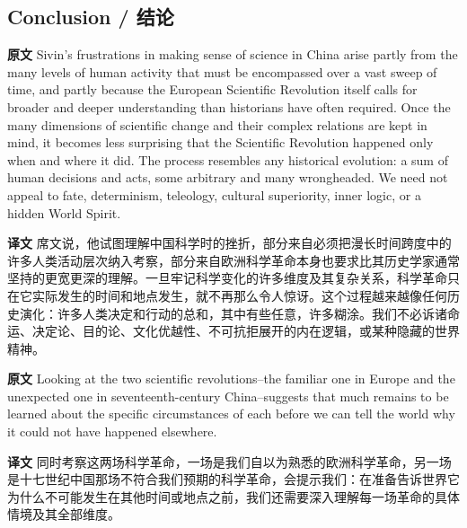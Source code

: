 \documentclass[UTF8,zihao=-4]{ctexart}
\newcommand{\BodyFont}{\fontsize{10.5pt}{15.5pt}\selectfont}
\newcommand{\origlabel}{\textbf{原文}\quad}
\newcommand{\translabel}{\textbf{译文}\quad}
\newenvironment{enblock}{\par\noindent\begingroup\BodyFont\origlabel}{\par\endgroup}
\newenvironment{zhblock}{\par\noindent\begingroup\BodyFont\translabel}{\par\endgroup\vspace{0.35em}}
\begin{document}
\subsection*{Conclusion / 结论}

\begin{enblock}
Sivin's frustrations in making sense of science in China arise partly from the many levels of human activity that must be encompassed over a vast sweep of time, and partly because the European Scientific Revolution itself calls for broader and deeper understanding than historians have often required. Once the many dimensions of scientific change and their complex relations are kept in mind, it becomes less surprising that the Scientific Revolution happened only when and where it did. The process resembles any historical evolution: a sum of human decisions and acts, some arbitrary and many wrongheaded. We need not appeal to fate, determinism, teleology, cultural superiority, inner logic, or a hidden World Spirit.
\end{enblock}
\begin{zhblock}
席文说，他试图理解中国科学时的挫折，部分来自必须把漫长时间跨度中的许多人类活动层次纳入考察，部分来自欧洲科学革命本身也要求比其历史学家通常坚持的更宽更深的理解。一旦牢记科学变化的许多维度及其复杂关系，科学革命只在它实际发生的时间和地点发生，就不再那么令人惊讶。这个过程越来越像任何历史演化：许多人类决定和行动的总和，其中有些任意，许多糊涂。我们不必诉诸命运、决定论、目的论、文化优越性、不可抗拒展开的内在逻辑，或某种隐藏的世界精神。
\end{zhblock}

\begin{enblock}
Looking at the two scientific revolutions--the familiar one in Europe and the unexpected one in seventeenth-century China--suggests that much remains to be learned about the specific circumstances of each before we can tell the world why it could not have happened elsewhere.
\end{enblock}
\begin{zhblock}
同时考察这两场科学革命，一场是我们自以为熟悉的欧洲科学革命，另一场是十七世纪中国那场不符合我们预期的科学革命，会提示我们：在准备告诉世界它为什么不可能发生在其他时间或地点之前，我们还需要深入理解每一场革命的具体情境及其全部维度。
\end{zhblock}
\end{document}
